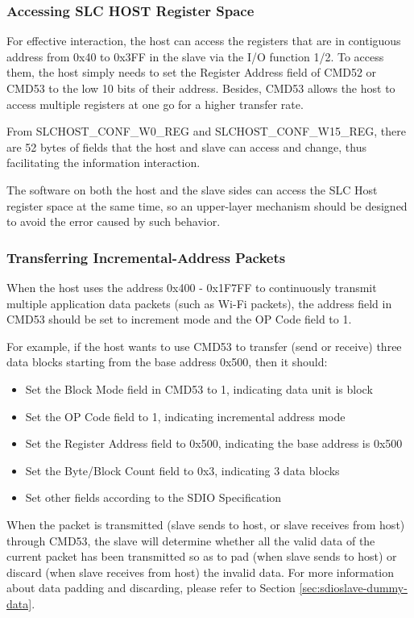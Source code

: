 \documentclass[main\_\_EN.tex]{subfiles}
\begin{document}
\subsubsection{Accessing SLC HOST Register Space}

For effective interaction, the host can access the registers that are in contiguous address from 0x40 to 0x3FF in the slave via the I/O function 1/2. To access them, the host simply needs to set the Register Address field of CMD52 or CMD53 to the low 10 bits of their address. Besides, CMD53 allows the host to access multiple registers at one go for a higher transfer rate.

From SLCHOST\_CONF\_W0\_REG and SLCHOST\_CONF\_W15\_REG, there are 52 bytes of fields that the host and slave can access and change, thus facilitating the information interaction.

The software on both the host and the slave sides can access the SLC Host register space at the same time, so an upper-layer mechanism should be designed to avoid the error caused by such behavior.

\subsubsection{Transferring Incremental-Address Packets}

When the host uses the address 0x400 - 0x1F7FF to continuously transmit multiple application data packets (such as Wi-Fi packets), the address field in CMD53 should be set to increment mode and the OP Code field to 1.

For example, if the host wants to use CMD53 to transfer (send or receive) three data blocks starting from the base address 0x500, then it should:

\begin{itemize}
    \item Set the Block Mode field in CMD53 to 1, indicating data unit is block
    \item Set the OP Code field to 1, indicating incremental address mode
    \item Set the Register Address field to 0x500, indicating the base address is 0x500
    \item Set the Byte/Block Count field to 0x3, indicating 3 data blocks
    \item Set other fields according to the SDIO Specification
\end{itemize}

When the packet is transmitted (slave sends to host, or slave receives from host) through CMD53, the slave will determine whether all the valid data of the current packet has been transmitted so as to pad (when slave sends to host) or discard (when slave receives from host) the invalid data. For more information about data padding and discarding, please refer to Section \ref{sec:sdioslave-dummy-data}.
\end{document}
